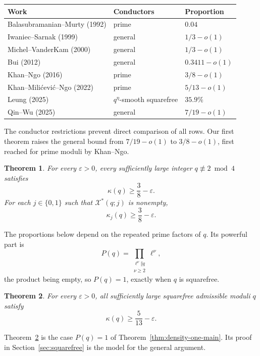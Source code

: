 \documentclass[12pt, a4paper]{amsart}
\numberwithin{equation}{section}
\newcommand{\ep}{\varepsilon}
\renewcommand{\ge}{\geqslant}
\theoremstyle{plain}
\newtheorem{thm}{Theorem}
\begin{document}
\begin{center}
\small
\begin{tabular}{@{}p{6.1cm}p{5.2cm}p{3.1cm}@{}}
\hline
Work & Conductors & Proportion \\
\hline
Balasubramanian--Murty \cite{BM} (1992)
  & prime & $0.04$ \\
Iwaniec--Sarnak \cite{IS} (1999)
  & general & $1/3-o(1)$ \\
Michel--VanderKam \cite{MV} (2000)
  & general & $1/3-o(1)$ \\
Bui \cite{Bui} (2012)
  & general & $0.3411-o(1)$ \\
Khan--Ngo \cite{KhanNgo} (2016)
  & prime & $3/8-o(1)$ \\
Khan--Mili\'cevi\'c--Ngo \cite{KMN} (2022)
  & prime & $5/13-o(1)$ \\
Leung \cite{Leung} (2025)
  & $q^\eta$-smooth squarefree & $35.9\%$ \\
Qin--Wu \cite{QW} (2025)
  & general & $7/19-o(1)$ \\
\hline
\end{tabular}
\end{center}

The conductor restrictions prevent direct comparison of all rows. Our first theorem raises the general bound from $7/19-o(1)$ to $3/8-o(1)$, first reached for prime moduli by Khan--Ngo.

\begin{thm}\label{thm:allq-three-eighths}
For every $\ep>0$, every sufficiently large integer $q\not\equiv2\bmod4$ satisfies
$$
\kappa(q)\ge\frac38-\ep.
$$
For each $j\in\{0,1\}$ such that $\mathcal X^*(q;j)$ is nonempty,
$$
\kappa_j(q)\ge\frac38-\ep.
$$
\end{thm}

 The proportions below depend on the repeated prime factors of $q$. Its powerful part is
\begin{equation}\label{eqn:powerful_part_definition}
P(q)=\prod_{\substack{\ell^\nu\Vert q\\\nu\ge2}}\ell^\nu,
\end{equation}
the product being empty, so $P(q)=1$, exactly when $q$ is squarefree.

\begin{thm}\label{thm:sqfree-nonvanishing}
For every $\ep>0$, all sufficiently large squarefree admissible moduli $q$ satisfy
$$
\kappa(q)\ge \frac5{13}-\ep.
$$
\end{thm}

Theorem~\ref{thm:sqfree-nonvanishing} is the case $P(q)=1$ of Theorem~\ref{thm:density-one-main}. Its proof in Section~\ref{sec:squarefree} is the model for the general argument.
\end{document}
